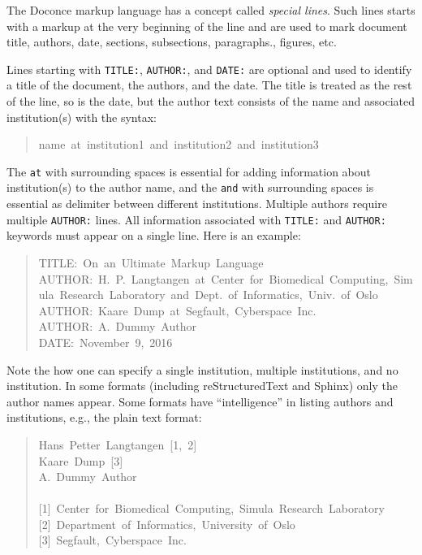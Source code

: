 \documentclass[a4paper,english]{article}
\begin{document}
The Doconce markup language has a concept called \emph{special lines}.
Such lines starts with a markup at the very beginning of the
line and are used to mark document title, authors, date,
sections, subsections, paragraphs., figures, etc.

Lines starting with \texttt{TITLE:}, \texttt{AUTHOR:}, and \texttt{DATE:} are optional and used
to identify a title of the document, the authors, and the date. The
title is treated as the rest of the line, so is the date, but the
author text consists of the name and associated institution(s) with
the syntax:
%
\begin{quote}{\ttfamily \raggedright \noindent
name~at~institution1~and~institution2~and~institution3
}
\end{quote}

The \texttt{at} with surrounding spaces
is essential for adding information about institution(s)
to the author name, and the \texttt{and} with surrounding spaces is
essential as delimiter between different institutions.
Multiple authors require multiple \texttt{AUTHOR:} lines. All information
associated with \texttt{TITLE:} and \texttt{AUTHOR:} keywords must appear on a single
line.  Here is an example:
%
\begin{quote}{\ttfamily \raggedright \noindent
TITLE:~On~an~Ultimate~Markup~Language\\
AUTHOR:~H.~P.~Langtangen~at~Center~for~Biomedical~Computing,~Simula~Research~Laboratory~and~Dept.~of~Informatics,~Univ.~of~Oslo\\
AUTHOR:~Kaare~Dump~at~Segfault,~Cyberspace~Inc.\\
AUTHOR:~A.~Dummy~Author\\
DATE:~November~9,~2016
}
\end{quote}

Note the how one can specify a single institution, multiple institutions,
and no institution. In some formats (including reStructuredText and Sphinx)
only the author names appear. Some formats have
``intelligence'' in listing authors and institutions, e.g., the plain text
format:
%
\begin{quote}{\ttfamily \raggedright \noindent
Hans~Petter~Langtangen~{[}1,~2{]}\\
Kaare~Dump~{[}3{]}\\
A.~Dummy~Author\\
~\\
{[}1{]}~Center~for~Biomedical~Computing,~Simula~Research~Laboratory\\
{[}2{]}~Department~of~Informatics,~University~of~Oslo\\
{[}3{]}~Segfault,~Cyberspace~Inc.
}
\end{quote}
\end{document}
